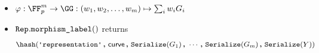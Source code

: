 \documentclass[11pt]{article}
\begin{document}
\begin{itemize}
  \item $\varphi:\FF_p^m\to\GG:(\witness_1,\witness_2, \dots, \witness_m)\mapsto \sum_i \witness_iG_i$
  \item $\texttt{Rep}.\texttt{morphism\_label}()$ returns
  \[
    \hash(\replabel \concat \curvectx \concat \serialize(G_1) \concat \cdots \concat \serialize(G_m) \concat \serialize(\statement))
  \]
\end{itemize}
\end{document}
